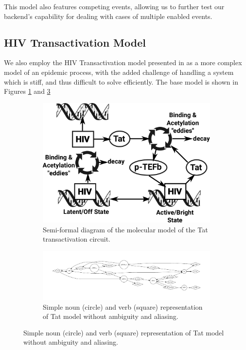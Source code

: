 \documentclass[11pt]{article}
\begin{document}
This model also features competing events, allowing us to further test our backend's capability for dealing with cases of multiple enabled events.

\subsection{HIV Transactivation Model}

We also employ the HIV Transactivation model presented in \cite{weinberger2005stochastic} as a more complex model of an epidemic process, with the added challenge of handling a system which is stiff, and thus difficult to solve efficiently.  The base model is shown in Figures \ref{Fig:HIV-Tat} and \ref{Fig:HIV-Tat-VDSOL}

\begin{figure}
\begin{subfigure}[b]{\textwidth}
\includegraphics[width=\textwidth]{figs/HIV-Tat-figure.pdf}
\caption{Semi-formal diagram of the molecular model of the Tat transactivation circuit.}
\label{Fig:HIV-Tat}
\end{subfigure}
\begin{subfigure}[b]{\textwidth}
\includegraphics[width=\textwidth]{figs/TatModel.pdf}
\caption{Simple noun (circle) and verb (square) representation of Tat model without ambiguity and aliasing.}
\label{Fig:HIV-Tat-VDSOL}
\end{subfigure}
\end{figure}
\end{document}
